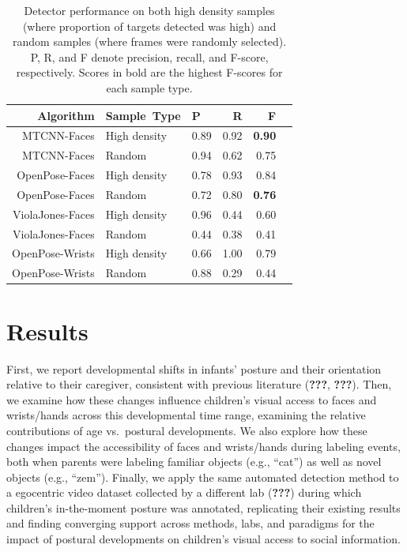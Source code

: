 \documentclass[english,man,floatsintext,draftall]{apa6}
\begin{document}
\begin{table}[ht]
\centering
\begin{tabular}{rllrrr}
\hline
Algorithm & Sample\ Type & P & R & F \\ 
\hline
MTCNN-Faces & High density & 0.89 & 0.92 & \textbf{0.90} \\ 
MTCNN-Faces & Random & 0.94 & 0.62 & 0.75 \\ 
OpenPose-Faces & High density & 0.78 & 0.93 & 0.84 \\ 
OpenPose-Faces & Random & 0.72 & 0.80 & \textbf{0.76} \\ 
ViolaJones-Faces & High density & 0.96 & 0.44 & 0.60 \\ 
ViolaJones-Faces & Random & 0.44 & 0.38 & 0.41 \\ 
OpenPose-Wrists & High density & 0.66 & 1.00 & 0.79 \\ 
OpenPose-Wrists & Random & 0.88 & 0.29 & 0.44 \\ 
\hline
\end{tabular}
\caption{Detector performance on both high density samples (where proportion of targets detected was high) and random samples (where frames were randomly selected). P, R, and F denote precision, recall, and F-score, respectively. Scores in bold are the highest F-scores for each sample type.} 
\vspace{-1em}
\end{table}

\section{Results}\label{results}

First, we report developmental shifts in infants' posture and their
orientation relative to their caregiver, consistent with previous
literature ({\textbf{???}}, {\textbf{???}}). Then, we examine how these
changes influence children's visual access to faces and wrists/hands
across this developmental time range, examining the relative
contributions of age vs.~postural developments. We also explore how
these changes impact the accessibility of faces and wrists/hands during
labeling events, both when parents were labeling familiar objects (e.g.,
\enquote{cat}) as well as novel objects (e.g., \enquote{zem}). Finally,
we apply the same automated detection method to a egocentric video
dataset collected by a different lab ({\textbf{???}}) during which
children's in-the-moment posture was annotated, replicating their
existing results and finding converging support across methods, labs,
and paradigms for the impact of postural developments on children's
visual access to social information.
\end{document}
